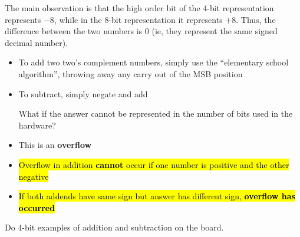\begin{frame}[fragile]
The main observation is that the high order bit of the 4-bit representation
represents $-8$, while in the 8-bit representation it represents $+8$.  Thus,
the difference between the two numbers is 0 (ie, they represent the same
signed decimal number).
\fi\ENotes
\end{frame}

\begin{frame}[fragile]
\begin{itemize}
\item To add two two's complement numbers, simply use the ``elementary
school algorithm'', throwing away any carry out of the MSB position
\item To subtract, simply negate and add
\begin{tcolorbox}[enhanced,attach boxed title to top center={yshift=-3mm,yshifttext=-1mm},
  colback=blue!5!white,colframe=blue!75!black,colbacktitle=blue!80!black,
  title=Think About It,fonttitle=\bfseries,
  boxed title style={size=small,colframe=red!50!black} ]
  
What if the answer cannot be represented in the number of bits used in the hardware?
\end{tcolorbox}
\item This is an \textbf{overflow}
\item \hl{Overflow in addition \textbf{cannot} occur if one number is positive and
the other negative}
\item \hl{If both addends have same sign but answer has different sign,
\textbf{overflow has occurred}}
\end{itemize}
\BNotes\ifnum{}
Do 4-bit examples of addition and subtraction on the board.
\fi\ENotes
\end{frame}


